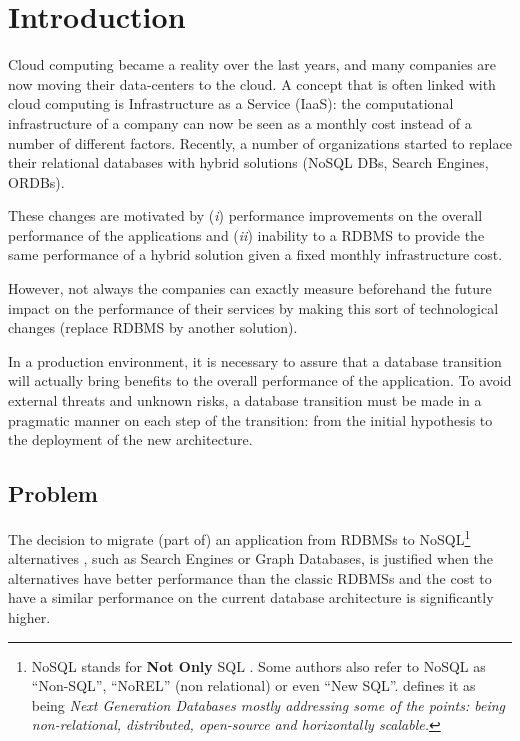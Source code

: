 \chapter{Introduction}

Cloud computing became a reality over the last years, and many companies are now moving their data-centers to the cloud. 
A concept that is often linked with cloud computing is Infrastructure as a Service (IaaS): the computational infrastructure of a company can now be seen as a monthly cost instead of a number of different factors. 
Recently, a number of organizations started to replace their relational databases with hybrid solutions (NoSQL DBs, Search Engines, ORDBs). 

These changes are motivated by (\textit{i}) performance improvements on the overall performance of the applications and (\textit{ii}) inability to a RDBMS to provide the same performance of a hybrid solution given a fixed monthly infrastructure cost.

However, not always the companies can exactly measure beforehand the future impact on the performance of their services by making this sort of technological changes (replace RDBMS by another solution).

In a production environment, it is necessary to assure that a database transition will actually bring benefits to the overall performance of the application. To avoid external threats and unknown risks, a database transition must be made in a pragmatic manner on each step of the transition: from the initial hypothesis to the deployment of the new architecture.


\section{Problem}

The decision to migrate (part of) an application from RDBMSs to NoSQL\footnote{ NoSQL stands for  \textbf{Not Only} SQL \cite{7023585}. Some authors also refer to NoSQL as ``Non-SQL'', ``NoREL'' (non relational) or even ``New SQL''. \cite{NOSQLDB} defines it as being \textit{
Next Generation Databases mostly addressing some of the points: being non-relational, distributed, open-source and horizontally scalable.}} alternatives , such as Search Engines or Graph Databases, is justified when the alternatives have better performance than the classic RDBMSs and the cost to have a similar performance on the current database architecture is significantly higher. 

